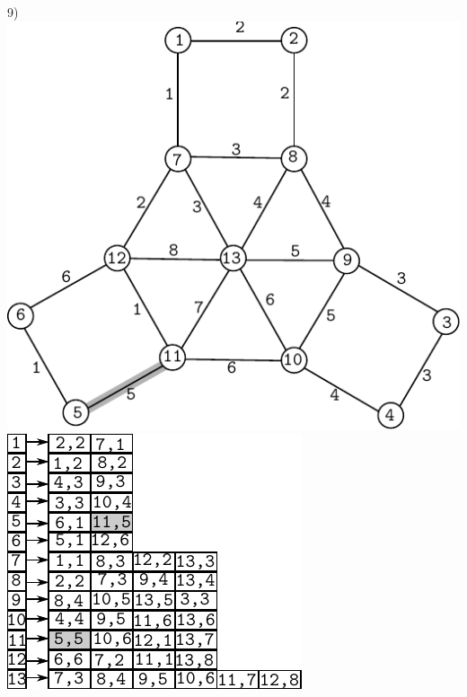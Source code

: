 \documentclass{article}
\begin{document}
\begin{center}
9)\includegraphics[scale=0.6]{bottleneck/g9}
\hspace{5mm}
\includegraphics[scale=0.9]{bottleneck/l9}
\end{center}
\end{document}
